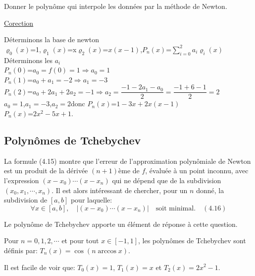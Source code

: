 Donner le polynôme qui interpole les données par la méthode de Newton.\\
\begin{center}
	\underline{Corection}
\end{center}
\hspace{0.8cm}Déterminons la base de newton\\ 
$\varrho_{0}(x)$=1,$\varrho_{1}(x) $=x$\varrho_{2}(x)$=$ x(x-1)$,$P_{n}(x)$=$ \displaystyle\sum_{i=0}^{2}a_{i}\varrho_{i}(x)$\\
\hspace{0.7cm}Déterminons les $a_{i}$\\
$P_{n}(0)$=$ a_{0}=f(0)=1\Rightarrow a_{0}=1$\\
$P_{n}(1)$=$ a_{0}+a_{1}=-2\Rightarrow a_{1}=-3$\\
$P_{n}(2)$=$ a_{0}+2a_{1}+2a_{2}=-1\Rightarrow a_{2}=\dfrac{-1-2a_{1}-a_{0}}{2}=\dfrac{-1+6-1}{2}=2$\\
$ a_{0}=1$,$ a_{1}=-3$,$ a_{2}=2$donc $P_{n}(x)$=$ 1-3x+2x(x-1)$\\
$P_{n}(x)$=$ 2x^{2}-5x+1$.\\


\subsection{Polynômes de Tchebychev}

La formule (4.15) montre que l'erreur de l'approximation polynômiale de Newton est un produit de la dérivée $(n+1)$ème de $f$, évaluée à un point inconnu, avec l'expression $(x-x_0)\cdots(x-x_n)$ qui ne dépend que de la subdivision $(x_0,x_1,\cdots,x_n)$. Il est alors intéressant de chercher, pour un $n$ donné, la subdivision de $[a, b]$ pour laquelle:
\[
\forall x \in [a, b], \quad |(x-x_0)\cdots(x-x_n)| \quad \text{soit minimal.} \quad (4.16)
\]

Le polynôme de Tchebychev apporte un élément de réponse à cette question.

\begin{definition}
	Pour $n = 0,1,2,\cdots$ et pour tout $x \in [-1,1]$, les polynômes de Tchebychev sont définis par: $T_n(x) = \cos(n\arccos x)$.
\end{definition}

Il est facile de voir que: $T_0(x) = 1$, $T_1(x) = x$ et $T_2(x) = 2x^2-1$.


